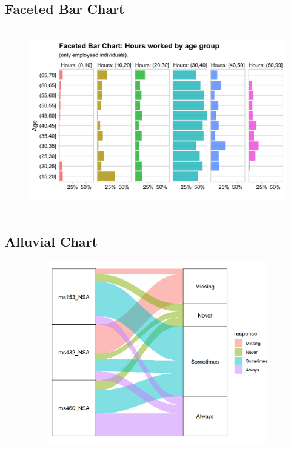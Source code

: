 \documentclass[12pt]{article}
\begin{document}
\newpage

\subsection*{Faceted Bar Chart}
\begin{figure}[h]
    \centering
    \includegraphics[width=12cm, height=8cm]{faceted-barchart.png}
    \centering
\end{figure}

\subsection*{Alluvial Chart}
\begin{figure}[h]
    \centering
    \includegraphics[width=12cm, height=8cm]{alluvial-plot-quintic.png}
    \centering
\end{figure}

\newpage
\end{document}
